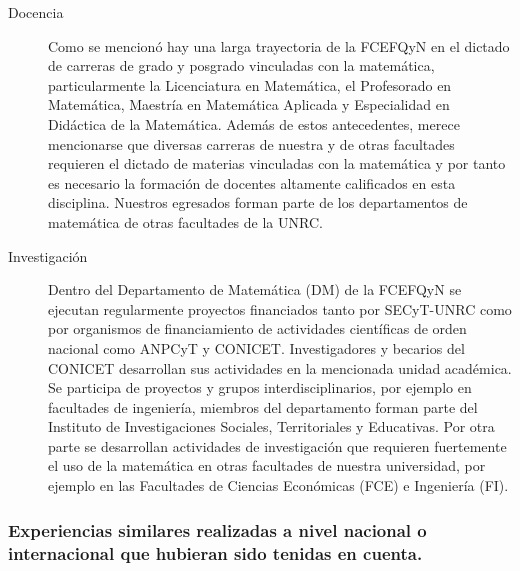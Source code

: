 \documentclass[a4paper, 12pt]{article}
\begin{document}
\begin{description}
 \item[Docencia] Como se mencionó hay una larga trayectoria  de la FCEFQyN en el dictado de carreras de grado y posgrado  vinculadas con la matemática, particularmente la Licenciatura en Matemática, el Profesorado en Matemática, Maestría en Matemática Aplicada y Especialidad en Didáctica de la Matemática. Además de estos antecedentes, merece mencionarse que diversas carreras de nuestra y de otras facultades requieren el dictado de materias vinculadas con la matemática y por tanto es necesario la formación de docentes altamente calificados en esta disciplina. Nuestros egresados forman parte de los departamentos de matemática de otras facultades de la UNRC.
 
 \item[Investigación] Dentro del Departamento de Matemática (DM) de la FCEFQyN se ejecutan regularmente  proyectos financiados tanto por SECyT-UNRC como por organismos de financiamiento de actividades científicas de orden  nacional como ANPCyT y CONICET. Investigadores y becarios del CONICET desarrollan sus actividades en la mencionada unidad académica. Se participa de proyectos y grupos interdisciplinarios, por ejemplo en  facultades de ingeniería, miembros del departamento forman parte  del Instituto de Investigaciones Sociales, Territoriales y  Educativas. Por otra parte se desarrollan actividades de investigación que requieren fuertemente el uso de la matemática en otras facultades de nuestra universidad, por ejemplo en las Facultades de Ciencias Económicas (FCE) e Ingeniería (FI).
 

 
 
\end{description}






\subsubsection{Experiencias similares realizadas a nivel nacional o internacional que hubieran sido tenidas en cuenta.}
\end{document}
